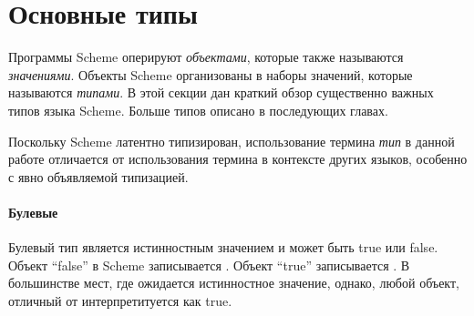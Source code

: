 \section{Основные типы}

Программы Scheme оперируют \textit{объектами}, которые также называются
\textit{значениями}. Объекты Scheme организованы в наборы значений, которые называются
\textit{типами}. В этой секции дан краткий обзор существенно важных типов языка Scheme. Больше
типов описано в последующих главах.

\begin{note}
  Поскольку Scheme латентно типизирован, использование термина \textit{тип} в данной работе
  отличается от использования термина в контексте других языков, особенно с явно объявляемой
  типизацией.
\end{note}

\paragraph{Булевые}

Булевый тип является истинностным значением и может быть true или
false. Объект ``false'' в Scheme записывается \schfalse{}.  Объект ``true'' записывается
\schtrue{}. В большинстве мест, где ожидается истинностное значение, однако, любой объект,
отличный от \schfalse{} интерпретитуется как true.

